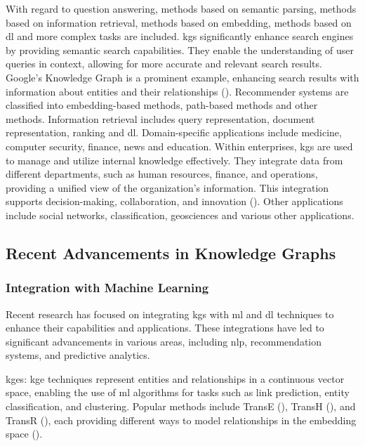 With regard to question answering, methods based on semantic parsing, methods based on information retrieval, methods based on embedding, methods based on \gls{dl} and more complex tasks are included.
\glspl{kg} significantly enhance search engines by providing semantic search capabilities. They enable the understanding of user queries in context, allowing for more accurate and relevant search results. Google's Knowledge Graph is a prominent example, enhancing search results with information about entities and their relationships (\cite{singhal2012introducing}).
Recommender systems are classified into embedding-based methods, path-based methods and other methods. Information retrieval includes query representation, document representation, ranking and \gls{dl}. Domain-specific applications include medicine, computer security, finance, news and education.
Within enterprises, \glspl{kg} are used to manage and utilize internal knowledge effectively. They integrate data from different departments, such as human resources, finance, and operations, providing a unified view of the organization's information. This integration supports decision-making, collaboration, and innovation (\cite{pujara2013knowledge}).
Other applications include social networks, classification, geosciences and various other applications.


\subsection*{Recent Advancements in Knowledge Graphs}

\subsubsection*{Integration with Machine Learning}
Recent research has focused on integrating \glspl{kg} with \gls{ml} and \gls{dl} techniques to enhance their capabilities and applications. These integrations have led to significant advancements in various areas, including \gls{nlp}, recommendation systems, and predictive analytics.

\glspl{kge}: \gls{kge} techniques represent entities and relationships in a continuous vector space, enabling the use of \gls{ml} algorithms for tasks such as link prediction, entity classification, and clustering. Popular methods include TransE (\cite{Bordes2013}), TransH (\cite{Wang2014}), and TransR (\cite{Lin2015}), each providing different ways to model relationships in the embedding space (\cite{Wang2017}).

